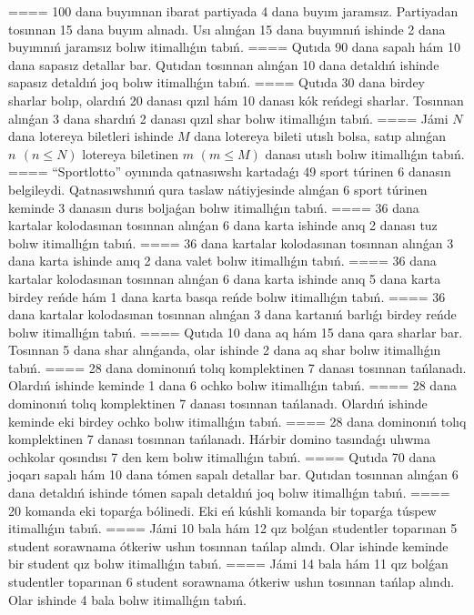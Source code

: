 ====
100 dana buyımnan ibarat partiyada 4 dana buyım jaramsız. Partiyadan tosınnan 15 dana buyım alınadı. Usı alınǵan 15 dana buyımnıń ishinde 2 dana buyımnıń jaramsız bolıw itimallıǵın tabıń.
====
Qutıda 90 dana sapalı hám 10 dana sapasız detallar bar. Qutıdan tosınnan alınǵan 10 dana detaldıń ishinde sapasız detaldıń joq bolıw itimallıǵın tabıń.
====
Qutıda 30 dana birdey sharlar bolıp, olardıń 20 danası qızıl hám 10 danası kók reńdegi sharlar. Tosınnan alınǵan 3 dana shardıń 2 danası qızıl shar bolıw itimallıǵın tabıń.
====
Jámi $N$ dana lotereya biletleri ishinde $M$ dana lotereya bileti utıslı bolsa, satıp alınǵan $n~\,\left( n\le N \right)$ lotereya biletinen $m\,\,\left( m\le M \right)$ danası utıslı bolıw itimallıǵın tabıń.
====
“Sportlotto” oyınında qatnasıwshı kartadaǵı 49 sport túrinen 6 danasın belgileydi. Qatnasıwshınıń qura taslaw nátiyjesinde alınǵan 6 sport túrinen keminde 3 danasın durıs boljaǵan bolıw itimallıǵın tabıń.
====
36 dana kartalar kolodasınan tosınnan alınǵan 6 dana karta ishinde anıq 2 danası tuz bolıw itimallıǵın tabıń.
====
36 dana kartalar kolodasınan tosınnan alınǵan 3 dana karta ishinde anıq 2 dana valet bolıw itimallıǵın tabıń.
====
36 dana kartalar kolodasınan tosınnan alınǵan 6 dana karta ishinde anıq 5 dana karta birdey reńde hám 1 dana karta basqa reńde bolıw itimallıǵın tabıń.
====
36 dana kartalar kolodasınan tosınnan alınǵan 3 dana kartanıń barlıǵı birdey reńde bolıw itimallıǵın tabıń.
====
Qutıda 10 dana aq hám 15 dana qara sharlar bar. Tosınnan 5 dana shar alınǵanda, olar ishinde 2 dana aq shar bolıw itimallıǵın tabıń.
====
28 dana dominonıń tolıq komplektinen 7 danası tosınnan tańlanadı. Olardıń ishinde keminde 1 dana 6 ochko bolıw itimallıǵın tabıń.
====
28 dana dominonıń tolıq komplektinen 7 danası tosınnan tańlanadı. Olardıń ishinde keminde eki birdey ochko bolıw itimallıǵın tabıń.
====
28 dana dominonıń tolıq komplektinen 7 danası tosınnan tańlanadı. Hárbir domino tasındaǵı ulıwma ochkolar qosındısı 7 den kem bolıw itimallıǵın tabıń.
====
Qutıda 70 dana joqarı sapalı hám 10 dana tómen sapalı detallar bar. Qutıdan tosınnan alınǵan 6 dana detaldıń ishinde tómen sapalı detaldıń joq bolıw itimallıǵın tabıń.
====
20 komanda eki toparǵa bólinedi. Eki eń kúshli komanda bir toparǵa túspew itimallıǵın tabıń.
====
Jámi 10 bala hám 12 qız bolǵan studentler toparınan 5 student sorawnama ótkeriw ushın tosınnan tańlap alındı. Olar ishinde keminde bir student qız bolıw itimallıǵın tabıń.
====
Jámi 14 bala hám 11 qız bolǵan studentler toparınan 6 student sorawnama ótkeriw ushın tosınnan tańlap alındı. Olar ishinde 4 bala bolıw itimallıǵın tabıń.
